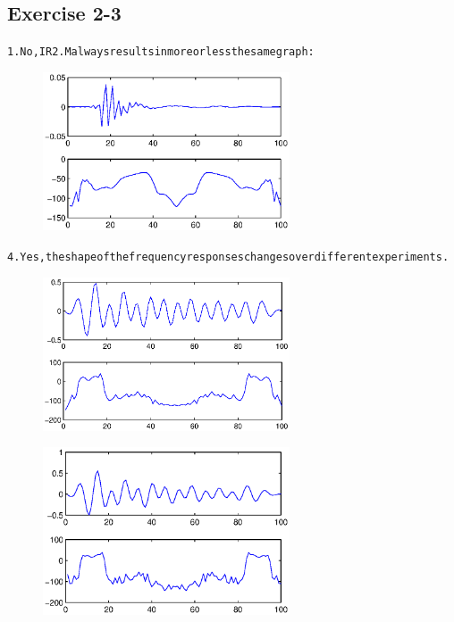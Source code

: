 \documentclass[a4paper,11pt]{article}
\begin{document}
\subsection{Exercise 2-3}
\begin{alltt}
1.	No, IR2.M always results in more or less thesame graph:
	\begin{figure}[h]
	  		\begin{center}
				\includegraphics[width=0.65\textwidth]{Sessie2/IR2.eps}
			\end{center}
			\label{benadering}
  	\end{figure}


4. Yes, the shape of the frequency responses changes over different experiments.
	\begin{figure}[H]
	  		\begin{center}
				\includegraphics[width=0.65\textwidth]{Sessie2/IRbs1.eps}
			\end{center}
			\label{benadering}
  	\end{figure}
  
  	
  	\begin{figure}[H]
	  		\begin{center}
				\includegraphics[width=0.65\textwidth]{Sessie2/IRbs2.eps}
			\end{center}
			\label{benadering}
  	\end{figure}
  

\end{alltt}
\end{document}
